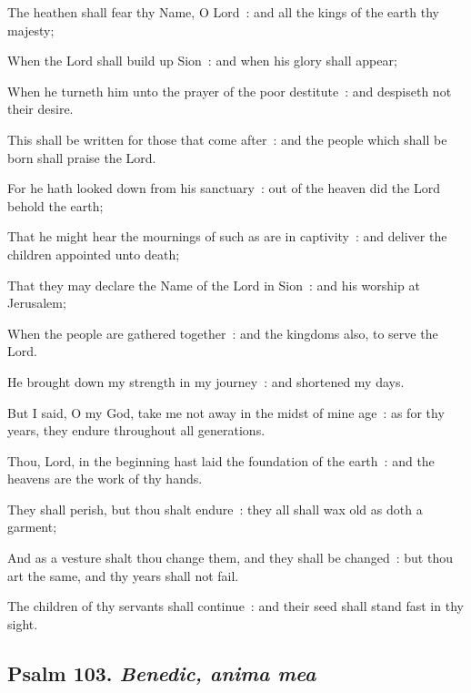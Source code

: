 The heathen shall fear thy Name, O Lord~: and all the kings of the earth thy majesty;\par
{}When the Lord shall build up Sion~: and when his glory shall appear;\par
{}When he turneth him unto the prayer of the poor destitute~: and despiseth not their desire.\par
{}This shall be written for those that come after~: and the people which shall be born shall praise the Lord.\par
{}For he hath looked down from his sanctuary~: out of the heaven did the Lord behold the earth;\par
{}That he might hear the mournings of such as are in captivity~: and deliver the children appointed unto death;\par
{}That they may declare the Name of the Lord in Sion~: and his worship at Jerusalem;\par
{}When the people are gathered together~: and the kingdoms also, to serve the Lord.\par
{}He brought down my strength in my journey~: and shortened my days.\par
{}But I said, O my God, take me not away in the midst of mine age~: as for thy years, they endure throughout all generations.\par
{}Thou, Lord, in the beginning hast laid the foundation of the earth~: and the heavens are the work of thy hands.\par
{}They shall perish, but thou shalt endure~: they all shall wax old as doth a garment;\par
{}And as a vesture shalt thou change them, and they shall be changed~: but thou art the same, and thy years shall not fail.\par
{}The children of thy servants shall continue~: and their seed shall stand fast in thy sight.\par


\clearpage
\subsection{Psalm 103. \textit{Benedic, anima mea}}


